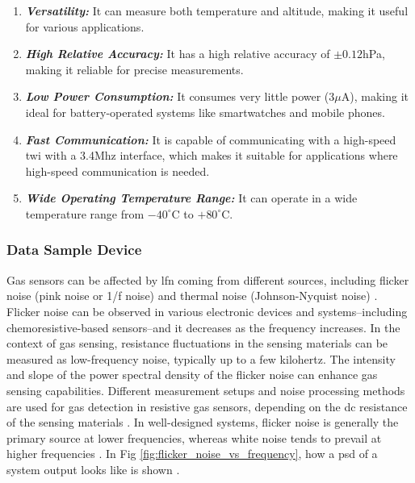 \begin{itemize}
        \begin{enumerate}
            \item \textbf{\textit{Versatility:}} It can measure both temperature and altitude, making it useful for various applications.

            \item \textbf{\textit{High Relative Accuracy:}} It has a high relative accuracy of $\pm0.12$hPa, making it reliable for precise measurements.

            \item \textbf{\textit{Low Power Consumption:}} It consumes very little power ($3\mu$A), making it ideal for battery-operated systems like smartwatches and mobile phones.

            \item \textbf{\textit{Fast Communication:}} It is capable of communicating with a high-speed \acrfull{twi} with a 3.4Mhz interface, which makes it suitable for applications where high-speed communication is needed.

            \item \textbf{\textit{Wide Operating Temperature Range:}} It can operate in a wide temperature range from $-40^{\circ}$C to $+80^{\circ}$C.
        \end{enumerate}
\end{itemize}


\subsubsection{Data Sample Device}
\label{sec:methodology:dev_methodology:sensors:dsd}
\hspace{8pt}
Gas sensors can be affected by \acrfull{lfn} coming from different sources, including flicker noise (pink noise or 1/f noise) and thermal noise (Johnson-Nyquist noise) \cite{Kwon_2014, wonjun_2023,smulko_2024}. \\

Flicker noise can be observed in various electronic devices and systems--including chemoresistive-based sensors--and it decreases as the frequency increases. In the context of gas sensing, resistance fluctuations in the sensing materials can be measured as low-frequency noise, typically up to a few kilohertz. The intensity and slope of the power spectral density of the flicker noise can enhance gas sensing capabilities. Different measurement setups and noise processing methods are used for gas detection in resistive gas sensors, depending on the \acrfull{dc} resistance of the sensing materials \cite{Kwon_2014, kiely_2017}. In well-designed systems, flicker noise is generally the primary source at lower frequencies, whereas white noise tends to prevail at higher frequencies \cite{bahreyni_2009}. In Fig \ref{fig:flicker_noise_vs_frequency}, how a \acrfull{psd} of a system output looks like is shown \cite{bahreyni_2009}.

